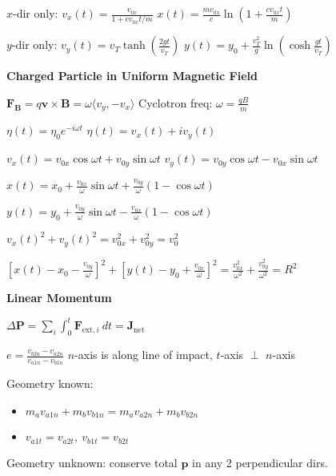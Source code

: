 \documentclass[twocolumn]{article}
\begin{document}
$x$-dir only: $v_x(t) = \frac{v_{0x}}{1 + cv_{0x}t/m}$ \hfill $x(t) = \frac{mv_{0x}}{c} \ln \left( 1 + \frac{cv_{0x}t}{m} \right)$

$y$-dir only: $v_y(t) = v_T \tanh \left( \frac{2gt}{v_T} \right)$ \hfill $y(t) = y_0 + \frac{v_T^2}{g} \ln \left( \cosh \frac{gt}{v_T} \right)$

\dotfill

\textbf{Charged Particle in Uniform Magnetic Field}

$\mathbf{F_B} = q \mathbf{v} \times \mathbf{B} = \omega \langle v_y, -v_x \rangle$ \hfill Cyclotron freq: $\omega = \frac{qB}{m}$

$\eta(t) = \eta_0 e^{-i \omega t}$ \hfill $\eta(t) = v_x(t) + i v_y(t)$

$v_x(t) = v_{0x} \cos \omega t + v_{0y} \sin \omega t$ \hfill $v_y(t) = v_{0y} \cos \omega t - v_{0x} \sin \omega t$

$x(t) = x_0 + \frac{v_{0x}}{\omega} \sin \omega t + \frac{v_{0y}}{\omega} (1 - \cos \omega t)$

$y(t) = y_0 + \frac{v_{0y}}{\omega} \sin \omega t - \frac{v_{0x}}{\omega} (1 - \cos \omega t)$

$v_x(t)^2 + v_y(t)^2 = v_{0x}^2 + v_{0y}^2 = v_0^2$

$\left[ x(t) - x_0 - \frac{v_{0y}}{\omega} \right]^2 + \left[ y(t) - y_0 + \frac{v_{0x}}{\omega} \right]^2 = \frac{v_{0x}^2}{\omega^2} + \frac{v_{0y}^2}{\omega^2} = R^2$

\dotfill

\textbf{Linear Momentum}

$\Delta \mathbf{P} = \sum_i \int_0^t \mathbf{F}_{\text{ext},i}\ dt = \mathbf{J}_{\text{net}}$

$e = \frac{v_{b2n} - v_{a2n}}{v_{a1n} - v_{b1n}}$ \hfill $n$-axis is along line of impact, $t$-axis $\perp$ $n$-axis

Geometry known:

\vspace{-.5em}\begin{itemize}
    \item $m_a v_{a1n} + m_b v_{b1n} = m_a v_{a2n} + m_b v_{b2n}$
    \item $v_{a1t} = v_{a2t},\ v_{b1t} = v_{b2t}$
\end{itemize} \vspace{-.5em}

Geometry unknown: conserve total $\mathbf{p}$ in any 2 perpendicular dirs.

\vspace{-.5em}
\dotfill
\end{document}
